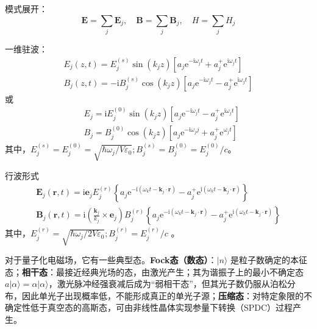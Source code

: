 \begin{enumerate}
	模式展开：
	$$
	\boldsymbol{E}=\sum_j \boldsymbol{E}_j, \quad \boldsymbol{B}=\sum_j \boldsymbol{B}_j, \quad H=\sum_j H_j
	$$
	
	一维驻波：
	$$
	\begin{gathered}
		E_j(z, t)=E_j^{(s)} \sin \left(k_j z\right)\left[a_j \mathrm{e}^{-\mathrm{i}\omega_j t}+a_j^{+} \mathrm{e}^{\mathrm{i} \omega_j t}\right] \\
		B_j(z, t)=-\mathrm{i} B_j^{(s)} \cos \left(k_j z\right)\left[a_j \mathrm{e}^{-\mathrm{i} \omega_j t}-a_j^{+} \mathrm{e}^{\mathrm{i} \omega_j t}\right]
	\end{gathered}
	$$
	或
	$$
	\begin{aligned}
		& E_j=\mathrm{i} E_j^{(0)} \sin \left(k_j z\right)\left[a_j \mathrm{e}^{-\mathrm{i}\omega_j t}-a_j^{+} \mathrm{e}^{\mathrm{i}\omega_j t}\right] \\
		& B_j=B_j^{(0)} \cos \left(k_j z\right)\left[a_j \mathrm{e}^{-\mathrm{i}\omega_j j}+a_j^{+} \mathrm{e}^{\mathrm{\omega}_j t}\right]
	\end{aligned}
	$$
	其中，$E_j^{(s)}=E_j^{(0)}=\sqrt{\hbar \omega_j / V \varepsilon_0} ; B_j^{(s)}=B_j^{(0)}=E_j^{(0)} / c 。$
	
	行波形式
	$$
	\begin{gathered}
		\boldsymbol{E}_j(\boldsymbol{r}, t)=\mathrm{i} \boldsymbol{e}_j E_j^{(r)}\left\{a_j \mathrm{e}^{-\mathrm{i}\left(\omega_k t-\boldsymbol{k}_j \cdot \boldsymbol{r}\right)}-a_j^{+} \mathrm{e}^{\mathrm{i}\left(\omega_k t-\boldsymbol{k}_j \cdot \boldsymbol{r}\right)}\right\} \\
		\boldsymbol{B}_j(\boldsymbol{r}, t)=\mathrm{i}\left(\frac{\boldsymbol{k}_j}{k_j} \times \boldsymbol{e}_j\right) B_j^{(r)}\left\{a_j \mathrm{e}^{-\mathrm{i}\left(\omega_k t-\boldsymbol{k}_j \cdot \boldsymbol{r}\right)}-a_j^{+} \mathrm{e}^{\mathrm{i}\left(\omega_k t-\boldsymbol{k}_j \cdot \boldsymbol{r}\right)}\right\}
	\end{gathered}
	$$
	其中，$E_j^{(r)}=\sqrt{\hbar \omega_j / 2 V \varepsilon_0} ; B_j^{(r)}=E_j^{(r)} / c$ 。
	
	对于量子化电磁场，它有一些典型态。\textbf{Fock态（数态）}：\(|n\rangle\) 是粒子数确定的本征态；\textbf{相干态}：最接近经典光场的态，由激光产生；其为谐振子上的最小不确定态$ a|\alpha\rangle = \alpha|\alpha\rangle $，激光脉冲经强衰减后成为“弱相干态”，但其光子数仍服从泊松分布，因此单光子出现概率低，不能形成真正的单光子源；\textbf{压缩态}：对特定象限的不确定性低于真空态的高斯态，可由非线性晶体实现参量下转换（SPDC）过程产生。
	

\end{enumerate}
